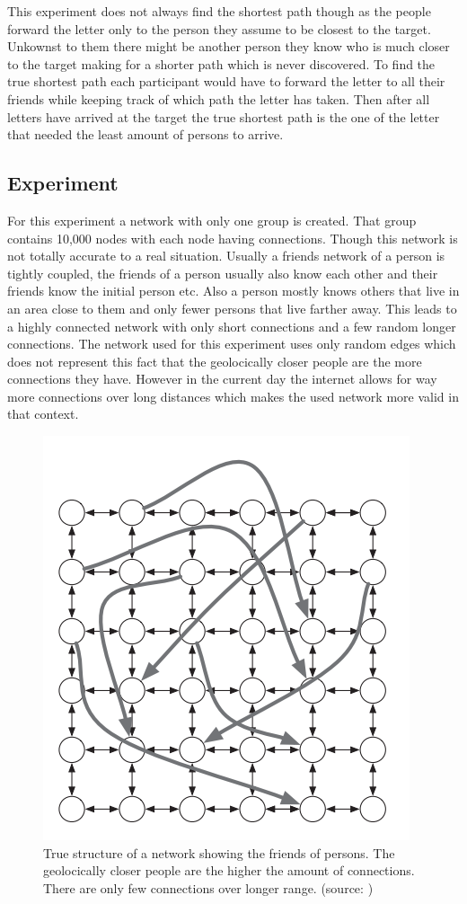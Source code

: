 This experiment does not always find the shortest path though as the people forward the letter
only to the person they assume to be closest to the target. Unkownst to them there might
be another person they know who is much closer to the target making for a shorter path which
is never discovered. To find the true shortest path each participant would have to forward
the letter to all their friends while keeping track of which path the letter has taken.
Then after all letters have arrived at the target the true shortest path is the one of the
letter that needed the least amount of persons to arrive.

\subsection{Experiment}
For this experiment a network with only one group is created. That group
contains 10,000 nodes with each node having %
connections. Though this network is not totally accurate to a real situation. Usually 
a friends network of a person is tightly coupled, the friends of a person usually also know
each other and their friends know the initial person etc. Also a person mostly knows
others that live in an area close to them and only fewer persons that live farther away.
This leads to a highly connected network with only short connections and a few random longer connections.
The network used for this experiment uses only random edges which does not represent this
fact that the geolocically closer people are the more connections they have. However in the
current day the internet allows for way more connections over long distances which makes
the used network more valid in that context.

\begin{figure}
    \centering
    \includegraphics[width=0.5\linewidth]{images/sw_true_network.png}
    \caption{True structure of a network showing the friends of persons. The
    geolocically closer people are the higher the amount of connections. There
    are only few connections over longer range. (source: \cite{networks})}
    \label{fig:oscillation}
\end{figure}


